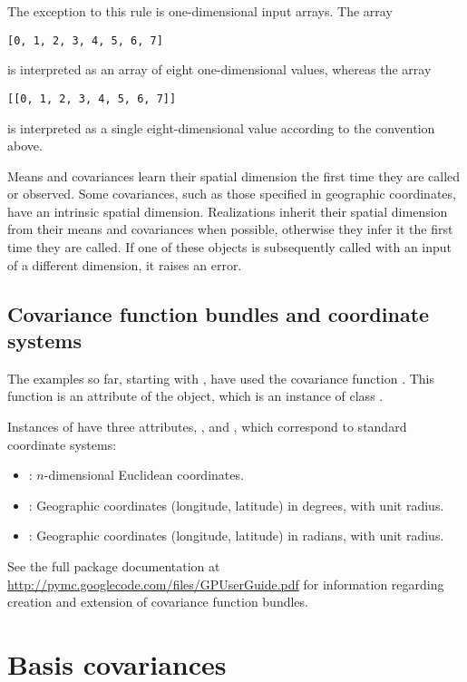 \documentclass[article]{jss}
\begin{document}
The exception to this rule is one-dimensional input arrays. The array
\begin{verbatim}
[0, 1, 2, 3, 4, 5, 6, 7]
\end{verbatim}
is interpreted as an array of eight one-dimensional values, whereas the array
\begin{verbatim}
[[0, 1, 2, 3, 4, 5, 6, 7]]
\end{verbatim}
is interpreted as a single eight-dimensional value according to the convention above.

Means and covariances learn their spatial dimension the first time they are called or observed. Some covariances, such as those specified in geographic coordinates, have an intrinsic spatial dimension. Realizations inherit their spatial dimension from their means and covariances when possible, otherwise they infer it the first time they are called. If one of these objects is subsequently called with an input of a different dimension, it raises an error.

\subsection{Covariance function bundles and coordinate systems}
The examples so far, starting with , have used the covariance function . This function is an attribute of the  object, which is an instance of class .

Instances of  have three attributes, ,  and , which correspond to standard coordinate systems:
\begin{itemize}
    \item {}: $n$-dimensional Euclidean coordinates.
    \item {}: Geographic coordinates (longitude, latitude) in degrees, with unit radius.
    \item {}: Geographic coordinates (longitude, latitude) in radians, with unit radius.
\end{itemize}

See the full package documentation at \href{http://pymc.googlecode.com/files/GPUserGuide.pdf}{http://pymc.googlecode.com/files/GPUserGuide.pdf} for information regarding creation and extension of covariance function bundles.

\section{Basis covariances}\label{sec:basis}
\end{document}
